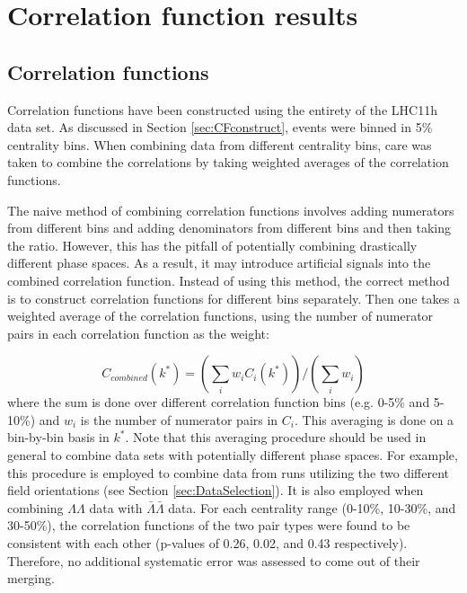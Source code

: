 \section{Correlation function results}
\subsection{Correlation functions}
\label{sec:CorrelationFunctions}

Correlation functions have been constructed using the entirety of the LHC11h data set.  
As discussed in Section \ref{sec:CFconstruct}, events were binned in 5\% centrality bins.  
When combining data from different centrality bins, care was taken to combine the correlations by taking weighted averages of the correlation functions.  

The naive method of combining correlation functions involves adding numerators from different bins and adding denominators from different bins and then taking the ratio.  
However, this has the pitfall of potentially combining drastically different phase spaces.  
As a result, it may introduce artificial signals into the combined correlation function.  
Instead of using this method, the correct method is to construct correlation functions for different bins separately.  
Then one takes a weighted average of the correlation functions, using the number of numerator pairs in each correlation function as the weight:

\begin{equation}
\label{eq:CombineCF}
C_{combined}(k^*) = (\displaystyle\sum\limits_{i} w_i C_i(k^*))/(\displaystyle\sum\limits_{i} w_i)
\end{equation}
where the sum is done over different correlation function bins (e.g. 0-5\% and 5-10\%) and $w_i$ is the number of numerator pairs in $C_i$.  
This averaging is done on a bin-by-bin basis in $k^*$.  
Note that this averaging procedure should be used in general to combine data sets with potentially different phase spaces. 
For example, this procedure is employed to combine data from runs utilizing the two different field orientations (see Section \ref{sec:DataSelection}).  
It is also employed when combining $\Lambda\Lambda$ data with $\bar{\Lambda}\bar{\Lambda}$ data.  For each centrality range (0-10\%, 10-30\%, and 30-50\%), the correlation functions of the two pair types were found to be consistent with each other (p-values of 0.26, 0.02, and 0.43 respectively).  
Therefore, no additional systematic error was assessed to come out of their merging.

